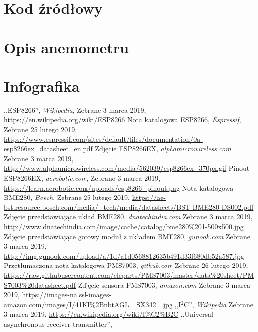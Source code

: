 \documentclass[12pt,a4paper,oneside]{memoir}
\begin{document}
\chapter{Kod źródłowy} 

\newpage
\chapter{Opis anemometru} 

\newpage
\chapter{Infografika} 

\newpage
\listoffigures
\newpage
\listoftables
\newpage
\begin{thebibliography}{16}
	,,ESP8266'',
	\textit{Wikipedia},
	Zebrane 3 marca 2019,
	\url{https://en.wikipedia.org/wiki/ESP8266}
	Nota katalogowa ESP8266,
	\textit{Espressif},
	Zebrane 25 lutego 2019,
	\url{https://www.espressif.com/sites/default/files/documentation/0a-esp8266ex_datasheet_en.pdf}
	Zdjęcie ESP8266EX,
	\textit{alphamicrowireless.com}
	Zebrane 3 marca 2019,
	\url{http://www.alphamicrowireless.com/media/562039/esp8266ex_370px.gif}
	Pinout ESP8266EX,
	\textit{acrobotic.com},
	Zebrane 3 marca 2019,
	\url{https://learn.acrobotic.com/uploads/esp8266_pinout.png}
	Nota katalogowa BME280,
	\textit{Bosch},
	Zebrane 25 lutego 2019,
	\url{https://ae-bst.resource.bosch.com/media/_tech/media/datasheets/BST-BME280-DS002.pdf}
	Zdjęcie przedstawiające układ BME280,
	\textit{dnatechindia.com}
	Zebrane 3 marca 2019,
	\url{http://www.dnatechindia.com/image/cache/catalog/bme280\%201-500x500.jpg}
	Zdjęcie przedstawiające gotowy moduł z układem BME280,
	\textit{gunook.com}
	Zebrane 3 marca 2019,
	\url{http://img.gunook.com/upload/a/1d/a1d0568812635b491d33f680db52a587.jpg}
	Przetłumaczona nota katalogowa PMS7003,
	\textit{github.com}
	Zebrane 26 lutego 2019,
	\url{https://raw.githubusercontent.com/eleparts/PMS7003/master/data\%20sheet/PMS7003\%20datasheet.pdf}
	Zdjęcie sensora PMS7003,
	\textit{amazon.com}
	Zebrane 3 marca 2019,
	\url{https://images-na.ssl-images-amazon.com/images/I/41KI\%2BnbtAGL._SX342_.jpg}
	,,I$^2$C'',
	\textit{Wikipedia}
	Zebrane 3 marca 2019,
	\url{https://en.wikipedia.org/wiki/I%C2%B2C}
	,,Universal asynchronous receiver-transmitter'', 

\end{thebibliography}
\end{document}
